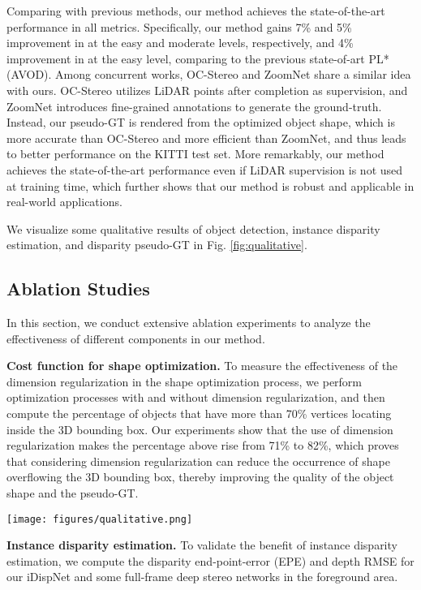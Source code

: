 \documentclass[10pt,twocolumn,letterpaper]{article}
\begin{document}
Comparing with previous methods, our method achieves the state-of-the-art performance in all metrics.
Specifically, our method gains 7\% and 5\% improvement in  at the easy and moderate levels, respectively, and 4\% improvement in  at the easy level, comparing to the previous state-of-art PL* (AVOD).
Among concurrent works, OC-Stereo \cite{ponObjectCentricStereoMatching2019} and ZoomNet \cite{xu2020zoomnet} share a similar idea with ours.
OC-Stereo utilizes LiDAR points after completion as supervision, and ZoomNet introduces fine-grained annotations to generate the ground-truth.
Instead, our pseudo-GT is rendered from the optimized object shape, which is more accurate than OC-Stereo and more efficient than ZoomNet, and thus leads to better performance on the KITTI test set.
More remarkably, our method achieves the state-of-the-art performance even if LiDAR supervision is not used at training time, which further shows that our method is robust and applicable in real-world applications.

We visualize some qualitative results of object detection, instance disparity estimation, and disparity pseudo-GT in Fig. \ref{fig:qualitative}.

\subsection{Ablation Studies}\label{sec:exp-ablation}
In this section, we conduct extensive ablation experiments to analyze the effectiveness of different components in our method.

\medskip\noindent\textbf{Cost function for shape optimization.}
To measure the effectiveness of the dimension regularization in the shape optimization process, we perform optimization processes with and without dimension regularization, and then compute the percentage of objects that have more than 70\% vertices locating inside the 3D bounding box. Our experiments show that the use of dimension regularization makes the percentage above rise from 71\% to 82\%, which proves that considering dimension regularization can reduce the occurrence of shape overflowing the 3D bounding box, thereby improving the quality of the object shape and the pseudo-GT.




\begin{figure*}
\vspace{-3em}
\centering
\texttt{[image: figures/qualitative.png]}
\caption{\textbf{Qualitative results.} The rows from top to bottom present 3D bounding box prediction, instance disparity estimation and our disparity pseudo-ground-truth, respectively.}
\label{fig:qualitative}
\end{figure*}  
\medskip\noindent\textbf{Instance disparity estimation.}
To validate the benefit of instance disparity estimation, we compute the disparity end-point-error (EPE) and depth RMSE for our iDispNet and some full-frame deep stereo networks in the foreground area.
\end{document}
